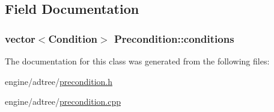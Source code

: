\subsection{Field Documentation}
\hypertarget{classPrecondition_a0da73e4336a0abd5a3ab22e0e2099690}{
\subsubsection[{conditions}]{\setlength{\rightskip}{0pt plus 5cm}vector$<${\bf Condition}$>$ {\bf Precondition::conditions}}}
\label{classPrecondition_a0da73e4336a0abd5a3ab22e0e2099690}


The documentation for this class was generated from the following files:\begin{DoxyCompactItemize}
\item 
engine/adtree/\hyperlink{precondition_8h}{precondition.h}\item 
engine/adtree/\hyperlink{precondition_8cpp}{precondition.cpp}\end{DoxyCompactItemize}
